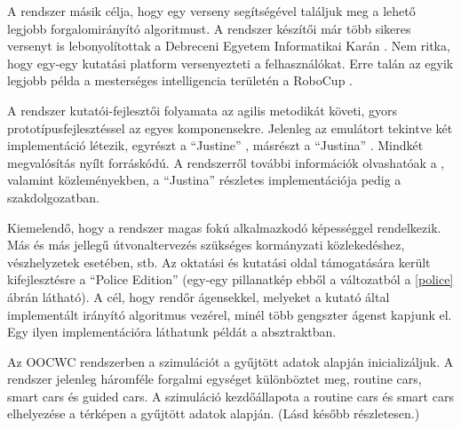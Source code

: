 \documentclass[a4paper,12pt]{report}
\begin{document}
A rendszer másik célja, hogy egy verseny segítségével találjuk meg a lehető legjobb forgalomirányító algoritmust. A rendszer készítői már több sikeres versenyt is lebonyolítottak a Debreceni Egyetem Informatikai Karán \cite{competitions}. Nem ritka, hogy egy-egy kutatási platform versenyezteti a felhasználókat. Erre talán az egyik legjobb példa a mesterséges intelligencia területén a RoboCup \cite{robocup}. 

A rendszer kutatói-fejlesztői folyamata az agilis metodikát követi, gyors prototípusfejlesztéssel az egyes komponensekre. Jelenleg az emulátort tekintve két implementáció létezik, egyrészt a ``Justine'' \cite{oocwcrepo}, másrészt a ``Justina'' \cite{justinarepo}. Mindkét megvalósítás nyílt forráskódú. A rendszerről további információk olvashatóak a \cite{7231223}, valamint \cite{infocomjournal} közleményekben, a ``Justina'' részletes implementációja pedig a \cite{mamenyak2015robotauto} szakdolgozatban.

Kiemelendő, hogy a rendszer magas fokú alkalmazkodó képességgel rendelkezik. Más és más jellegű útvonaltervezés szükséges kormányzati közlekedéshez, vészhelyzetek esetében, stb. Az oktatási és kutatási oldal támogatására került kifejlesztésre a ``Police Edition'' (egy-egy pillanatkép ebből a változatból a \ref{police} ábrán látható). A cél, hogy rendőr ágensekkel, melyeket a kutató által implementált irányító algoritmus vezérel, minél több gengszter ágenst kapjunk el. Egy ilyen implementációra láthatunk példát a \cite{forkcoginfocom} absztraktban.

Az OOCWC rendszerben a szimulációt a gyűjtött adatok alapján inicializáljuk. A rendszer jelenleg háromféle forgalmi egységet különböztet meg, routine cars, smart cars és guided cars. A szimuláció kezdőállapota a routine cars és smart cars elhelyezése a térképen a gyűjtött adatok alapján. (Lásd később részletesen.)
\end{document}
